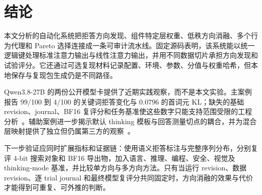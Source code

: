 \section{结论}

本文分析的自动化系统把拒答方向发现、组件特定层权重、低秩方向消融、多个行为代理和 Pareto 选择连接成一条可审计流水线。固定源码表明，该系统能以统一逻辑键处理标准注意力输出与线性注意力输出，并用不同数据切片承担方向发现和试验评分。它还通过可选复现材料记录配置、环境、参数、分值与权重哈希，但本地保存与复现包生成仍是不同路径。

Qwen3.8-27B 的两份公开模型卡提供了近期实践观察，而不是本文实验。主案例报告 99/100 到 4/100 的关键词拒答变化与 0.0796 的首词元 KL；缺失的基础 revision、journal、BF16 复评分和任务基准使这些数字只能支持范围受限的工程分析~\cite{qwen38maincase}。辅助案例进一步揭示默认 thinking 模板与回答测量切点的耦合，并为混合层映射提供了独立但仍属第三方的观察~\cite{qwen38auxcase}。

下一步验证应同时扩展指标和证据链：使用语义拒答标注与完整序列分布，分别复评 4-bit 搜索对象和 BF16 导出物，加入语言、推理、编程、安全、视觉及 thinking-mode 基准，并比较单方向与多方向方法。只有当运行 revision、数据 revision、逐 trial journal 和最终模型复评分共同固定时，方向消融的效果与代价才能得到可重复、可外推的判断。
